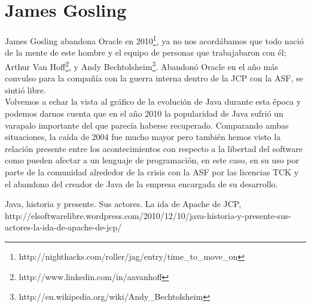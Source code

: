 \documentclass[11pt]{scrartcl}
\begin{document}
\section{James Gosling}

James Gosling abandona Oracle en 2010\footnote{http://nighthacks.com/roller/jag/entry/time\_to\_move\_on}, ya no nos acordábamos que todo nació de la mente de este hombre y el equipo de personas que trabajabaron con él; Arthur Van Hoff\footnote{http://www.linkedin.com/in/aavanhoff}, y Andy Bechtolsheim\footnote{http://en.wikipedia.org/wiki/Andy\_Bechtolsheim}. Abandonó Oracle en el año más convulso para la compañía con la guerra interna dentro de la JCP con la ASF, se sintió libre.\\

Volvemos a echar la vista al gráfico de la evolución de Java durante esta época y podemos darnos cuenta que en el año 2010 la popularidad de Java sufrió un varapalo importante del que parecía haberse recuperado. Comparando ambas situaciones, la caída de 2004 fue mucho mayor pero también hemos visto la relación presente entre los acontecimientos con respecto a la libertad del software como pueden afectar a un lenguaje de programación, en este caso, en su uso por parte de la comunidad alrededor de la crisis con la ASF por las licencias TCK y el abandono del creador de Java de la empresa encargada de su desarrollo.

\begin{thebibliography}{9}

        Java, historia y presente. Sus actores. La ida de Apache de JCP,\\
        http://elsoftwarelibre.wordpress.com/2010/12/10/java-historia-y-presente-sus-actores-la-ida-de-apache-de-jcp/

\end{thebibliography}
\end{document}

